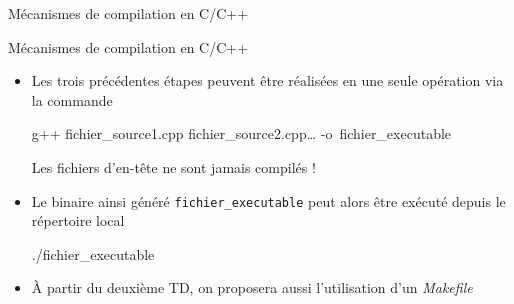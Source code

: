 \documentclass[c]{beamer}
\begin{document}
\begin{frame}[fragile]{Mécanismes de compilation en C/C++}


\end{frame}


\begin{frame}[fragile]{Mécanismes de compilation en C/C++}
\begin{itemize}
\item Les trois précédentes étapes peuvent être réalisées en une seule opération via
la commande

\begin{cbox}
\begin{prompt}
g++ fichier\_source1.cpp fichier\_source2.cpp\ldots{} -o~fichier\_executable
\end{prompt}
\end{cbox}

\begin{cbox}[][][\centering]
 Les fichiers d'en-tête ne sont jamais compilés !
\end{cbox}

\item Le binaire ainsi généré \texttt{fichier\_executable} peut alors être exécuté depuis le
répertoire local
\begin{cbox}
\begin{prompt}
./fichier\_executable
\end{prompt}
\end{cbox}

\item À partir du deuxième TD, on proposera aussi l'utilisation d'un \textit{Makefile}

\end{itemize}
\end{frame}
\end{document}
